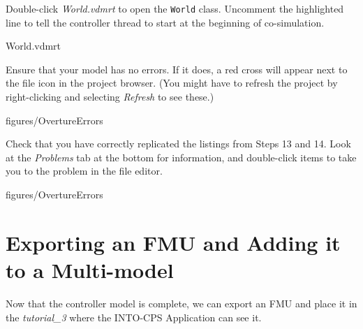 \documentclass[11pt,a4paper]{../tutorial}
\begin{document}
\begin{instructions}
\item \label{step:world} Double-click \emph{World.vdmrt} to open the \texttt{World} class. Uncomment the highlighted line to tell the controller thread to start at the beginning of co-simulation.

    \bigskip
    
    {World.vdmrt}

\item Ensure that your model has no errors. If it does, a red cross will appear next to the file icon in the project browser. (You might have to refresh the project by right-clicking and selecting \emph{Refresh} to see these.)

    \begin{annotation}[width=0.25\linewidth,trim=0 340 535 60,clip]{figures/OvertureErrors}
    \end{annotation}

    Check that you have correctly replicated the listings from Steps 13 and 14. Look at the \emph{Problems} tab at the bottom for information, and double-click items to take you to the problem in the file editor.

    \begin{annotation}[width=0.99\linewidth,trim=0 0 0 400,clip]{figures/OvertureErrors}
    \end{annotation}

\end{instructions}

\section{Exporting an FMU and Adding it to a Multi-model}

Now that the controller model is complete, we can export an FMU and place it in the \emph{tutorial\_3} where the INTO-CPS Application can see it.
\end{document}
